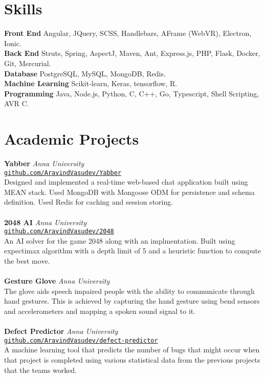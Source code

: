 \documentclass{resume}
\begin{document}
\section*{Skills}
\noindent
\textbf{Front End} Angular, JQuery, SCSS, Handlebars, AFrame (WebVR), Electron, Ionic. \\
\textbf{Back End} Struts, Spring, AspectJ, Maven, Ant, Express.js, PHP, Flask, Docker, Git, Mercurial. \\
\textbf{Database} PostgreSQL, MySQL, MongoDB, Redis. \\
\textbf{Machine Learning} Scikit-learn, Keras, tensorflow, R. \\
\textbf{Programming} Java, Node.js, Python, C, C++, Go, Typescript, Shell Scripting, AVR C.

\section*{Academic Projects}
\noindent
\textbf{Yabber} \hfill \textit{Anna University} \\
\texttt{\small \href{https://github.com/AravindVasudev/Yabber}{github.com/AravindVasudev/Yabber}} \\
Designed and implemented a real-time web-based chat application built using MEAN stack. Used MongoDB with Mongoose ODM for persistence and schema definition. Used Redis for caching and session storing.  \\
\\
\textbf{2048 AI} \hfill \textit{Anna University} \\
\texttt{\small \href{https://github.com/AravindVasudev/2048}{github.com/AravindVasudev/2048}} \\
An AI solver for the game 2048 along with an implmentation. Built using expectimax algorithm with a depth limit of 5 and a heuristic function to compute the best move. \\
\\
\textbf{Gesture Glove} \hfill \textit{Anna University} \\
The glove aids speech impaired people with the ability to communicate through hand gestures. This is achieved by capturing the hand gesture using bend sensors and accelerometers and mapping a spoken sound signal to it.\\
\\
\textbf{Defect Predictor} \hfill \textit{Anna University} \\
\texttt{\small \href{https://github.com/AravindVasudev/defect-predictor}{github.com/AravindVasudev/defect-predictor}} \\
A machine learning tool that predicts the number of bugs that might occur when that project is completed using various statistical data from the previous projects that the teams worked. 
\end{document}
